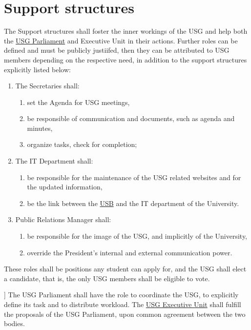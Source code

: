 \documentclass[12pt]{LaTeX_Misc/constitution}
\begin{document}
\section{Support structures} 
\label{suppstrucdef}
The Support structures shall foster the inner workings of the USG and help both the \hyperref[USGParliamentDef]{USG Parliament} and Executive Unit in their actions. Further roles can be defined and must be publicly justiifed, then they can be attributed to USG members depending on the respective need, in addition to the support structures explicitly listed below:
\begin{enumerate}[label={\textbf{\S\arabic*}}]
\item The Secretaries shall:
\begin{enumerate}
\item set the Agenda for USG meetings,
\item be responsible of communication and documents, such as agenda and minutes,
\item organize tasks, check for completion;
\end{enumerate}

\item The IT Department shall:
\begin{enumerate}
\item be responsible for the maintenance of the USG related websites and for the updated information,
\item be the link between the \hyperref[studentbody]{USB} and the IT department of the University.
\end{enumerate}

\item Public Relations Manager shall:
\begin{enumerate}
    \item be responsible for the image of the USG, and implicitly of the University, 
    \item override the President's internal and external communication power.
\end{enumerate}

\end{enumerate}
These roles shall be positions any student can apply for, and the USG shall elect a candidate, that is, the only USG members shall be eligible to vote.



]
\label{USGParliamentDef}
The USG Parliament shall have the role to coordinate the USG, to explicitly define its task and to distribute workload. The \hyperref[USGexecutiveUnitDef]{USG Executive Unit} shall fulfill the proposals of the USG Parliament, upon common agreement between the two bodies.
\end{document}
